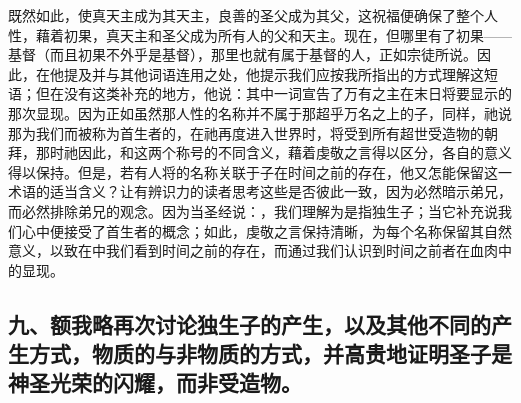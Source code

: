 既然如此，使真天主成为其天主，良善的圣父成为其父，这祝福便确保了整个人性，藉着初果，真天主和圣父成为所有人的父和天主。现在，但哪里有了初果——基督（而且初果不外乎是基督），那里也就有属于基督的人，正如宗徒所说。因此，在他提及并与其他词语连用之处，他提示我们应按我所指出的方式理解这短语；但在没有这类补充的地方，他说：其中一词宣告了万有之主在末日将要显示的那次显现。因为正如虽然那人性的名称并不属于那超乎万名之上的子，同样，祂说那为我们而被称为首生者的，在祂再度进入世界时，将受到所有超世受造物的朝拜，那时祂因此，和这两个称号的不同含义，藉着虔敬之言得以区分，各自的意义得以保持。但是，若有人将的名称关联于子在时间之前的存在，他又怎能保留这一术语的适当含义？让有辨识力的读者思考这些是否彼此一致，因为必然暗示弟兄，而必然排除弟兄的观念。因为当圣经说：，我们理解为是指独生子；当它补充说我们心中便接受了首生者的概念；如此，虔敬之言保持清晰，为每个名称保留其自然意义，以致在中我们看到时间之前的存在，而通过我们认识到时间之前者在血肉中的显现。\par


\subsection{九、额我略再次讨论独生子的产生，以及其他不同的产生方式，物质的与非物质的方式，并高贵地证明圣子是神圣光荣的闪耀，而非受造物。}

